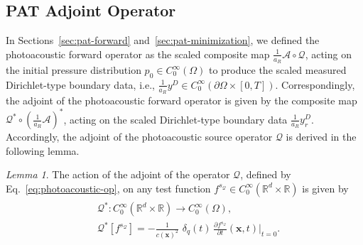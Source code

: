\documentclass[11pt,reqno]{amsart}
\theoremstyle{remark}
\newtheorem{lemma}{Lemma}
\newcommand{\bx}{\boldsymbol{x}}
\begin{document}
\subsection{PAT Adjoint Operator} \label{sec:pat-adjoint}

In Sections~\ref{sec:pat-forward} and~\ref{sec:pat-minimization}, we defined the photoacoustic forward operator as the scaled composite map \( \frac{1}{a_R}\mathcal{A} \circ \mathcal{Q} \), acting on the initial pressure distribution \( p_0 \in C_0^\infty(\Omega) \) to produce the scaled measured Dirichlet-type boundary data, i.e., \( \frac{1}{a_R} y^D \in C_0^\infty(\partial \Omega \times [0,T]) \). Correspondingly, the adjoint of the photoacoustic forward operator is given by the composite map \( \mathcal{Q}^* \circ \left( \frac{1}{a_R} \mathcal{A} \right)^* \), acting on the scaled Dirichlet-type
boundary data \( \frac{1}{a_R} y_r^D \). Accordingly, the adjoint of the photoacoustic source operator \(\mathcal{Q}\) is derived in the following lemma.

\begin{lemma}
 The action of the adjoint of the operator \(\mathcal{Q} \), defined by Eq.~\eqref{eq:photoacoustic-op}, on any test function 
    \( f^{s_{\mathcal{Q}}} \in C_0^\infty(\mathbb{R}^d \times \mathbb{R}) \) is given by
    \begin{align}  \label{eq:adjoint-photoacoustic}
        \begin{split}
        &\mathcal{Q}^*: C_0^\infty(\mathbb{R}^d \times \mathbb{R}) 
        \rightarrow C_0^\infty(\Omega), \\
        &\mathcal{Q}^*[f^{s_{\mathcal{Q}}}]
        = - \frac{1}{c(\bx)^2}\,  \,   \delta_q(t) \, \frac{\partial  f^{s_{\mathcal{Q}} } }{\partial t}
       (\bx,t) \rvert_{t=0}.
       \end{split}
    \end{align}
\end{lemma}
\end{document}
